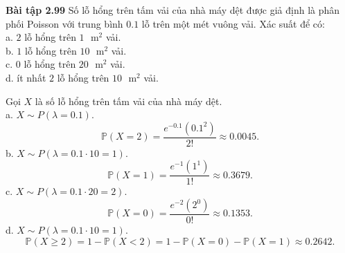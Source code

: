 \documentclass[12pt,a4paper]{article}
\begin{document}
\begin{mybox}
\textbf{Bài tập 2.99} Số lỗ hổng trên tấm vải của nhà máy dệt được giả định là phân phối Poisson với trung bình $0.1$ lỗ trên một mét vuông vải. Xác suất để có:\\
a. $2$ lỗ hổng trên $1 \text{ } \mathrm{m}^2$ vải.\\
b. $1$ lỗ hổng trên $10 \text{ } \mathrm{m}^2$ vải.\\
c. $0$ lỗ hổng trên $20 \text{ } \mathrm{m}^2$ vải.\\
d. ít nhất $2$ lỗ hổng trên $10 \text{ } \mathrm{m}^2$ vải.
\end{mybox}
Gọi $X$ là số lỗ hổng trên tấm vải của nhà máy dệt.\\
a. $X \sim P \left( {\lambda = 0.1} \right).$\\
$$\mathbb{P} \left( {X = 2} \right) = \frac{e^{-0.1} \left( {0.1}^2 \right)}{2!} \approx 0.0045.$$
b. $X \sim P \left( {\lambda = 0.1 \cdot 10 = 1} \right).$\\
$$\mathbb{P} \left( {X = 1} \right) = \frac{e^{-1} \left( {1}^1 \right)}{1!} \approx 0.3679.$$
c. $X \sim P \left( {\lambda = 0.1 \cdot 20 = 2} \right).$\\
$$\mathbb{P} \left( {X = 0} \right) = \frac{e^{-2} \left( {2}^0 \right)}{0!} \approx 0.1353.$$
d. $X \sim P \left( {\lambda = 0.1 \cdot 10 = 1} \right).$\\
$$\mathbb{P} \left( {X \geqslant 2} \right) = 1 - \mathbb{P} \left( {X < 2} \right) = 1 - \mathbb{P} \left( {X = 0} \right) - \mathbb{P} \left( {X = 1} \right) \approx 0.2642 .$$
\end{document}
